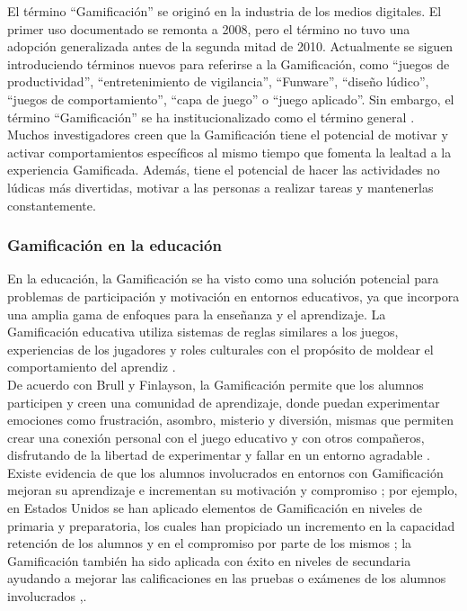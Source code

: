 El término ``Gamificación'' se originó en la industria de los medios digitales. El primer uso documentado se remonta a 2008, pero el término no tuvo una adopción generalizada antes de la segunda mitad de 2010. Actualmente se siguen introduciendo términos nuevos para referirse a la Gamificación, como ``juegos de productividad'', ``entretenimiento de vigilancia'', ``Funware'', ``diseño lúdico'', ``juegos de comportamiento'', ``capa de juego'' o ``juego aplicado''. Sin embargo, el término ``Gamificación'' se ha institucionalizado como el término general \cite{definicion1}.\\
    
\noindent Muchos investigadores creen que la Gamificación tiene el potencial de motivar y activar comportamientos específicos al mismo tiempo que fomenta la lealtad a la experiencia Gamificada. Además, tiene el potencial de hacer las actividades no lúdicas más divertidas, motivar a las personas a realizar tareas y mantenerlas constantemente. \cite{education1}

\clearpage

\subsubsection{Gamificación en la educación}

En la educación, la Gamificación se ha visto como una solución potencial para problemas de participación y motivación en entornos educativos, ya que incorpora una amplia gama de enfoques para la enseñanza y el aprendizaje. La Gamificación educativa utiliza sistemas de reglas similares a los juegos, experiencias de los jugadores y roles culturales con el propósito de moldear el comportamiento del aprendiz \cite{education1}.\\
    
\noindent De acuerdo con Brull y Finlayson, la Gamificación permite que los alumnos participen y creen una comunidad de aprendizaje, donde puedan experimentar emociones como frustración, asombro, misterio y diversión, mismas que permiten crear una conexión personal con el juego educativo y con otros compañeros, disfrutando de la libertad de experimentar y fallar en un entorno agradable \cite{education3}.\\ %

\noindent Existe evidencia de que los alumnos involucrados en entornos con Gamificación mejoran su aprendizaje e incrementan su motivación y compromiso \cite{education4}; por ejemplo, en Estados Unidos se han aplicado elementos de Gamificación en niveles de primaria y preparatoria, los cuales han propiciado un incremento en la capacidad retención de los alumnos y en el compromiso por parte de los mismos \cite{education3}; la Gamificación también ha sido aplicada con éxito en niveles de secundaria ayudando a mejorar las calificaciones en las pruebas o exámenes de los alumnos involucrados \cite{education2},\cite{education5}.


